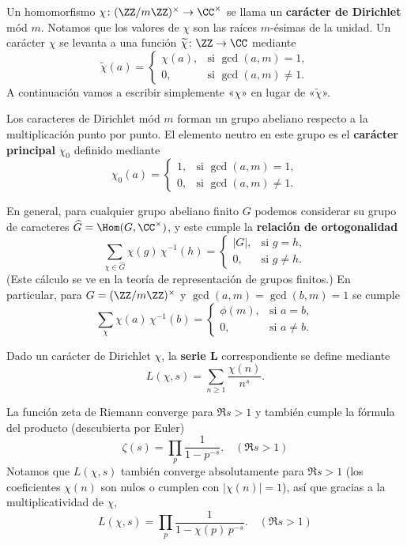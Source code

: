 Un homomorfismo $\chi\colon (\ZZ/m\ZZ)^\times \to \CC^\times$ se llama un
\textbf{carácter de Dirichlet} mód $m$. Notamos que los valores de $\chi$
son las raíces $m$-ésimas de la unidad. Un carácter $\chi$ se levanta a una
función $\widetilde{\chi}\colon \ZZ \to \CC$ mediante
\[ \widetilde{\chi} (a) = \begin{cases}
  \chi (a), & \text{si }\gcd (a,m) = 1, \\
  0, & \text{si }\gcd (a,m) \ne 1.
\end{cases} \]
A continuación vamos a escribir simplemente «$\chi$» en lugar de
«$\widetilde{\chi}$».

Los caracteres de Dirichlet mód $m$ forman un grupo abeliano respecto a
la multiplicación punto por punto. El elemento neutro en este grupo es el
\textbf{carácter principal} $\chi_0$ definido mediante
\[ \chi_0 (a) = \begin{cases}
  1, & \text{si }\gcd (a,m) = 1,\\
  0, & \text{si }\gcd (a,m) \ne 1.
\end{cases} \]

En general, para cualquier grupo abeliano finito $G$ podemos considerar su grupo
de caracteres $\widehat{G} = \Hom (G, \CC^\times)$, y este cumple la
\textbf{relación de ortogonalidad}
\[ \sum_{\chi \in \widehat{G}} \chi (g)\,\chi^{-1} (h) = \begin{cases}
    |G|, & \text{si }g = h,\\
    0, & \text{si }g \ne h.
\end{cases} \]
(Este cálculo se ve en la teoría de representación de grupos finitos.)
En particular, para $G = (\ZZ/m\ZZ)^\times$ y $\gcd (a,m) = \gcd (b,m) = 1$ se
cumple
\begin{equation}
  \label{eqn:relacion-de-ortogonalidad}
  \sum_\chi \chi (a)\,\chi^{-1} (b) = \begin{cases}
    \phi (m), & \text{si }a = b,\\
    0, & \text{si }a \ne b.
  \end{cases}
\end{equation}

\begin{definicion}
  Dado un carácter de Dirichlet $\chi$, la \textbf{serie L} correspondiente
  se define mediante
  $$L (\chi, s) = \sum_{n\ge 1} \frac{\chi (n)}{n^s}.$$
\end{definicion}

La función zeta de Riemann converge para $\Re s > 1$ y también cumple la
fórmula del producto (descubierta por Euler)
$$\zeta (s) = \prod_p \frac{1}{1 - p^{-s}}. \quad (\Re s > 1)$$
Notamos que $L (\chi,s)$ también converge absolutamente para $\Re s > 1$
(los coeficientes $\chi (n)$ son nulos o cumplen con $|\chi (n)| = 1$),
así que gracias a la multiplicatividad de $\chi$,
$$L (\chi,s) = \prod_p \frac{1}{1 - \chi (p)\,p^{-s}}. \quad (\Re s > 1)$$

